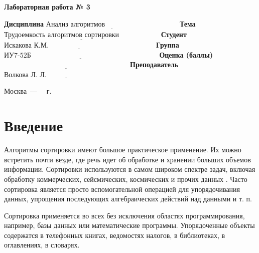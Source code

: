 \documentclass[12pt]{report}
\begin{document}
\begin{center}
\Large\textbf{Лабораторная работа № 3}
\end{center}
\vspace{\baselineskip}
\noindent\textbf{Дисциплина} $\underline{\text{Анализ алгоритмов~~~~~~~~~~~~~~~~~~~~~~~~~~~~~~~}}$\newline\newline
\noindent\textbf{Тема} $\underline{\text{Трудоемкость алгоритмов сортировки~~~~~~~~~~~~~~~~~}}$\newline\newline
\noindent\textbf{Студент} $\underline{\text{Искакова К.М.~~~~~~~~~~~~~~~~~~~~~~~~~~~~~~~~~~~~~~~~~~~~~}}$\newline\newline
\noindent\textbf{Группа} $\underline{\text{ИУ7-52Б~~~~~~~~~~~~~~~~~~~~~~~~~~~~~~~~~~~~~~~~~~~~~~~~~~~~~~}}$\newline\newline
\noindent\textbf{Оценка (баллы)} $\underline{\text{~~~~~~~~~~~~~~~~~~~~~~~~~~~~~~~~~~~~~~~~~~~~~~~~~~~~~}}$\newline\newline
\noindent\textbf{Преподаватель} $\underline{\text{Волкова Л. Л.~~~~~~~~~~~~~~~~~~~~~~~~~~~~~~~~~~~}}$\newline

\begin{center}
	\vfill
	Москва~---~\the\year
	~г.
\end{center}
\clearpage

\tableofcontents

\newpage
\chapter*{Введение}
Алгоритмы сортировки имеют большое практическое применение.
Их можно встретить почти везде, где речь идет об обработке и хранении больших объемов информации.
Сортировки используются в самом широком спектре задач, включая обработку коммерческих, сейсмических, космических и прочих данных \cite{academy}.
Часто сортировка является просто вспомогательной операцией для упорядочивания данных, упрощения последующих алгебраических действий над данными и т. п.

Сортировка применяется во всех без исключения областях программирования, например, базы данных или математические программы.
Упорядоченные объекты содержатся в телефонных книгах, ведомостях налогов, в библиотеках, в оглавлениях, в словарях.
\end{document}

